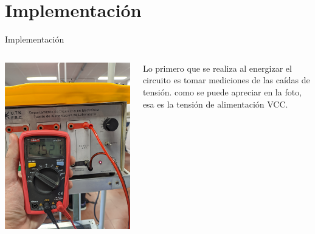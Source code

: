 \section{Implementación}
\begin{frame}{Implementación}

\end{frame}

\begin{frame}{}
  \begin{columns}[c] %
      \centering
      \includegraphics[width=\linewidth]{pictures/VCC.jpg}

      \justifying
        Lo primero que se realiza al energizar el circuito es tomar mediciones de las caídas de tensión. como se puede
        apreciar en la foto, esa es la tensión de alimentación VCC. 
      
  \end{columns}
\end{frame}

